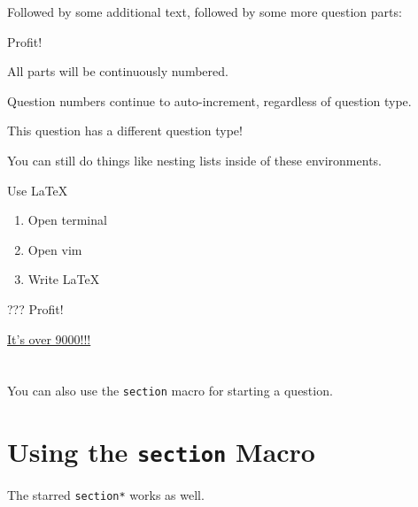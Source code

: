 \documentclass[11pt,largemargins]{homework}
\begin{document}
    Followed by some additional text, followed by some more question parts:

    \begin{alphaparts}
        \questionpart Profit!
    \end{alphaparts}

    All parts will be continuously numbered.

\question
  Question numbers continue to auto-increment, regardless of question type.

  \lipsum[4]

\renewcommand{\questiontype}{Task}
\question
  This question has a different question type!

  \lipsum[5]

\renewcommand{\questiontype}{Question}

\question
  You can still do things like nesting lists inside of these environments.
  \begin{alphaparts}
    \questionpart Use \LaTeX
      \begin{enumerate}
        \item Open terminal
        \item Open vim
        \item Write LaTeX
      \end{enumerate}
    \questionpart ???
    \questionpart Profit!
  \end{alphaparts}

  \lipsum[9]

\setcounter{questionCounter}{9000}
\question
  \href{https://www.youtube.com/watch?v=SiMHTK15Pik}{It's over 9000!!!}

  \lipsum[6]


\section{}
  You can also use the \texttt{section} macro for starting a question.

  \lipsum[10]

\section*{Using the \texttt{section} Macro}
  The starred \texttt{section*} works as well.

  \lipsum[11]
\end{document}
